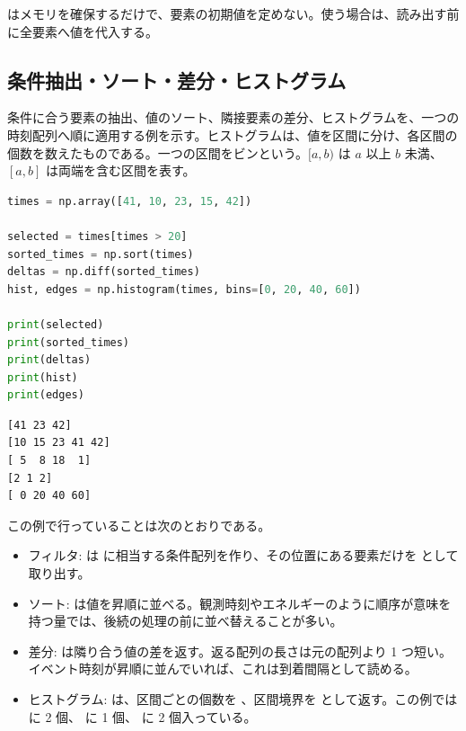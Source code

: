  はメモリを確保するだけで、要素の初期値を定めない。使う場合は、読み出す前に全要素へ値を代入する。

\subsection{条件抽出・ソート・差分・ヒストグラム}

条件に合う要素の抽出、値のソート、隣接要素の差分、ヒストグラムを、一つの時刻配列へ順に適用する例を示す。ヒストグラムは、値を区間に分け、各区間の個数を数えたものである。一つの区間をビンという。\([a,b)\) は \(a\) 以上 \(b\) 未満、\([a,b]\) は両端を含む区間を表す。

\begin{lstlisting}[language=Python]
times = np.array([41, 10, 23, 15, 42])

selected = times[times > 20]
sorted_times = np.sort(times)
deltas = np.diff(sorted_times)
hist, edges = np.histogram(times, bins=[0, 20, 40, 60])

print(selected)
print(sorted_times)
print(deltas)
print(hist)
print(edges)
\end{lstlisting}

\begin{lstlisting}[numbers=none, xleftmargin=2\zw]
[41 23 42]
[10 15 23 41 42]
[ 5  8 18  1]
[2 1 2]
[ 0 20 40 60]
\end{lstlisting}

この例で行っていることは次のとおりである。

\begin{itemize}
\item フィルタ:  は  に相当する条件配列を作り、その位置にある要素だけを  として取り出す。
\item ソート:  は値を昇順に並べる。観測時刻やエネルギーのように順序が意味を持つ量では、後続の処理の前に並べ替えることが多い。
\item 差分:  は隣り合う値の差を返す。返る配列の長さは元の配列より 1 つ短い。イベント時刻が昇順に並んでいれば、これは到着間隔として読める。
\item ヒストグラム:  は、区間ごとの個数を 、区間境界を  として返す。この例では \code{[0, 20)} に 2 個、\code{[20, 40)} に 1 個、\code{[40, 60]} に 2 個入っている。
\end{itemize}

